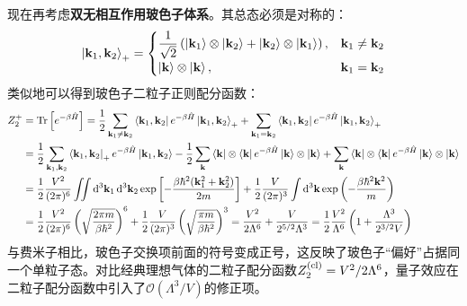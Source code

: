 现在再考虑\textbf{双无相互作用玻色子体系}。其总态必须是对称的：
\[\ket{\mathbf{k}_1,\mathbf{k}_2}_+=
\begin{cases}
\dfrac{1}{\sqrt{2}}\left(\ket{\mathbf{k}_1}\otimes\ket{\mathbf{k}_2}+\ket{\mathbf{k}_2}\otimes\ket{\mathbf{k}_1}\right), & \mathbf{k}_1\neq \mathbf{k}_2\\
\ket{\mathbf{k}}\otimes\ket{\mathbf{k}}, & \mathbf{k}_1=\mathbf{k}_2
\end{cases}\]
类似地可以得到玻色子二粒子正则配分函数：
\[\begin{aligned}
Z_2^+&=\Tr\left[e^{-\beta\hat{H}}\right]=\frac{1}{2}\sum_{\mathbf{k}_1\neq \mathbf{k}_2}\bra{\mathbf{k}_1,\mathbf{k}_2} e^{-\beta\hat{H}}\ket{\mathbf{k}_1,\mathbf{k}_2}_++\sum_{\mathbf{k}_1=\mathbf{k}_2}\bra{\mathbf{k}_1,\mathbf{k}_2} e^{-\beta\hat{H}}\ket{\mathbf{k}_1,\mathbf{k}_2}_+\\
&=\frac{1}{2}\sum_{\mathbf{k}_1,\mathbf{k}_2}\bra{\mathbf{k}_1,\mathbf{k}_2}_+ e^{-\beta\hat{H}}\ket{\mathbf{k}_1,\mathbf{k}_2}-\frac{1}{2}\sum_{\mathbf{k}}\bra{\mathbf{k}}\otimes\bra{\mathbf{k}}e^{-\beta\hat{H}}\ket{\mathbf{k}}\otimes\ket{\mathbf{k}}+\sum_{\mathbf{k}}\bra{\mathbf{k}}\otimes\bra{\mathbf{k}}e^{-\beta\hat{H}}\ket{\mathbf{k}}\otimes\ket{\mathbf{k}}\\
&=\frac{1}{2}\frac{V^2}{(2\pi)^6}\iint \dd[3]{\mathbf{k}_1}\dd[3]{\mathbf{k}_2}\exp\left[-\frac{\beta\hbar^2(\mathbf{k}_1^2+\mathbf{k}_2^2)}{2m}\right]+\frac{1}{2}\frac{V}{(2\pi)^3}\int \dd[3]{\mathbf{k}}\exp\left(-\frac{\beta\hbar^2\mathbf{k}^2}{m}\right)\\
&=\frac{1}{2}\frac{V^2}{(2\pi)^6}\left(\sqrt{\frac{2\pi m}{\beta\hbar^2}}\right)^6+\frac{1}{2}\frac{V}{(2\pi)^3}\left(\sqrt{\frac{\pi m}{\beta\hbar^2}}\right)^3=\frac{V^2}{2\Lambda^6}+\frac{V}{2^{5/2}\Lambda^3}=\frac{1}{2}\frac{V^2}{\Lambda^6}\left(1+\frac{\Lambda^3}{2^{3/2}V}\right)
\end{aligned}\]
与费米子相比，玻色子交换项前面的符号变成正号，这反映了玻色子“偏好”占据同一个单粒子态。对比经典理想气体的二粒子配分函数$Z_2^{\rm (cl)}=V^2/2\Lambda^6$，量子效应在二粒子配分函数中引入了$\mathcal{O}(\Lambda^3/V)$的修正项。

